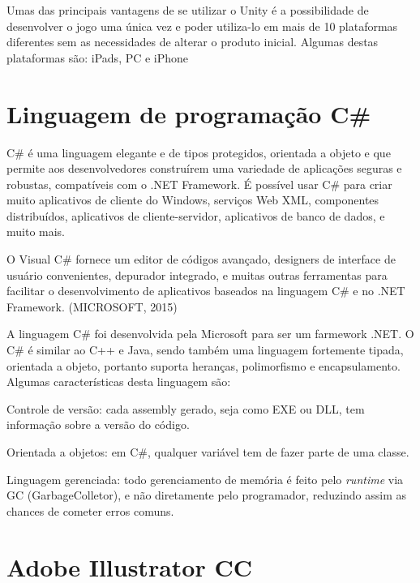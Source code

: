 Umas das principais vantagens de se utilizar o Unity é a possibilidade de desenvolver o jogo uma única vez e poder utiliza-lo em mais de 10 plataformas diferentes sem as necessidades de alterar o produto inicial. 
Algumas destas plataformas são: iPads, PC e iPhone


\section{Linguagem de programação C\#}
\label{sec:Linguagem-de-programação-Csharp}

C\# é uma linguagem elegante e de tipos protegidos, orientada a objeto e que permite aos desenvolvedores construírem uma variedade de aplicações seguras e robustas, compatíveis com o .NET Framework. É possível usar C\# para criar muito aplicativos de cliente do Windows, serviços Web XML, componentes distribuídos, aplicativos de cliente-servidor, aplicativos de banco de dados, e muito mais. 

O Visual C\# fornece um editor de códigos avançado, designers de interface de usuário convenientes, depurador integrado, e muitas outras ferramentas para facilitar o desenvolvimento de aplicativos baseados na linguagem C\# e no .NET Framework. (MICROSOFT, 2015)

A linguagem C\# foi desenvolvida pela Microsoft para ser um farmework .NET. 
O C\# é similar ao C++ e Java, sendo também uma linguagem fortemente tipada, orientada a objeto, portanto suporta heranças, polimorfismo e encapsulamento. 
Algumas características desta linguagem são: 

\begin{alineascomponto}
	\item Controle de versão: cada assembly gerado, seja como EXE ou DLL, tem informação sobre a versão do código. 

	\item Orientada a objetos: em C\#, qualquer variável tem de fazer parte de uma classe.  

	\item Linguagem gerenciada: todo gerenciamento de memória é feito pelo \textit{runtime} via GC (GarbageColletor), e não diretamente pelo programador, reduzindo assim as chances de cometer erros comuns.
\end{alineascomponto}

\section{Adobe Illustrator CC}
\label{sec:Adobe-Illustrato-CC}

